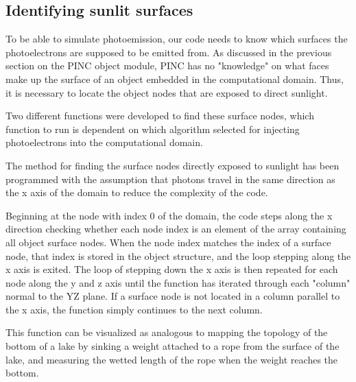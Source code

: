 \subsection{Identifying sunlit surfaces}

To be able to simulate photoemission, our code needs to know which surfaces the photoelectrons are supposed to be emitted from. As discussed in the previous section on the PINC object module, PINC has no "knowledge" on what faces make up the surface of an object embedded in the computational domain. Thus, it is necessary to locate the object nodes that are exposed to direct sunlight.

Two different functions were developed to find these surface nodes, which function to run is dependent on which algorithm selected for injecting photoelectrons into the computational domain.

The method for finding the surface nodes directly exposed to sunlight has been programmed with the assumption that photons travel in the same direction as the x axis of the domain to reduce the complexity of the code. 

Beginning at the node with index 0 of the domain, the code steps along the x direction checking whether each node index is an element of the array containing all object surface nodes. When the node index matches the index of a surface node, that index is stored in the object structure, and the loop stepping along the x axis is exited. The loop of stepping down the x axis is then repeated for each node along the y and z axis until the function has iterated through each "column" normal to the YZ plane. If a surface node is not located in a column parallel to the x axis, the function simply continues to the next column.

This function can be visualized as analogous to mapping the topology of the bottom of a lake by sinking a weight attached to a rope from the surface of the lake, and measuring the wetted length of the rope when the weight reaches the bottom.


